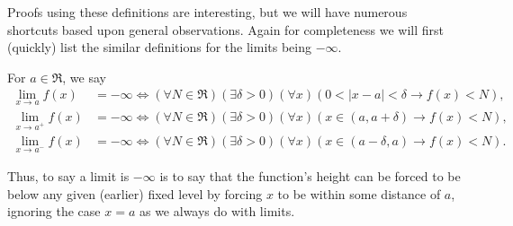 Proofs using these definitions are interesting, but
we will have numerous shortcuts based upon general
observations. Again for completeness 
we will first (quickly) list the similar definitions
for the limits being $-\infty$.
\begin{definition} For $a\in\Re$, we say
\begin{align}\lim_{x\to a}f(x)&=-\infty
\iff (\forall N\in\Re)(\exists \delta>0)(\forall x)(0<|x-a|<\delta
\longrightarrow f(x)<N),\label{F(x)->-Infty}\\
\lim_{x\to a^+}f(x)&=-\infty\iff(\forall N\in\Re)(\exists \delta>0)(\forall x)
    (x\in(a,a+\delta)\longrightarrow f(x)<N),\\
\lim_{x\to a^-}f(x)&=-\infty\iff(\forall N\in\Re)(\exists \delta>0)(\forall x)
    (x\in(a-\delta,a)\longrightarrow f(x)<N).
\end{align}
\end{definition}
Thus, to say a limit is $-\infty$ is to say that the function's
height can be forced to be below any given (earlier) fixed level
by forcing $x$ to be within some distance of $a$, ignoring
the case $x=a$ as we always do with limits.

